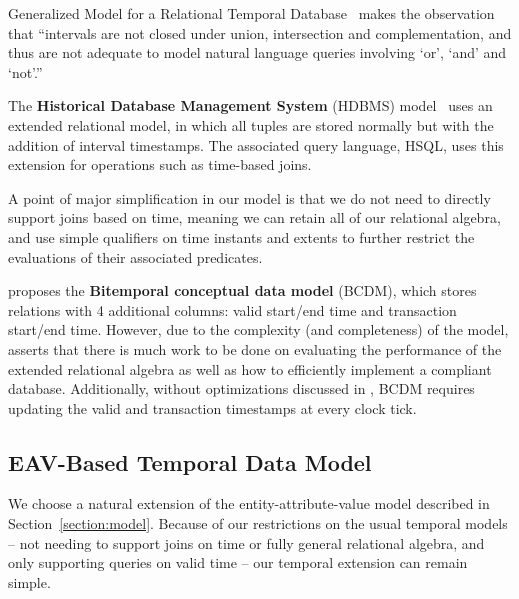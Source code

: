Generalized Model for a Relational Temporal
Database~\cite{gadia1988generalized} makes the observation that ``intervals are
not closed under union, intersection and complementation, and thus are not
adequate to model natural language queries involving `or', `and' and `not'.''

The \textbf{Historical Database Management System} (HDBMS)
model~\cite{sarda1990extensions} uses an extended relational model, in which
all tuples are stored normally but with the addition of interval timestamps.
The associated query language, HSQL, uses this extension for operations such as
time-based joins.

A point of major simplification in our model is that we do not need to directly
support joins based on time, meaning we can retain all of our relational
algebra, and use simple qualifiers on time instants and extents to further
restrict the evaluations of their associated predicates.

\cite{jensen1994unifying} proposes the \textbf{Bitemporal conceptual data
model} (BCDM), which stores relations with 4 additional columns: valid
start/end time and transaction start/end time. However, due to the complexity
(and completeness) of the model, \cite{jensen1999temporal} asserts that there
is much work to be done on evaluating the performance of the extended
relational algebra as well as how to efficiently implement a compliant
database. Additionally, without optimizations discussed in
\cite{jensen1999temporal}, BCDM requires updating the valid and transaction
timestamps at every clock tick.


\subsection{EAV-Based Temporal Data Model}

We choose a natural extension of the entity-attribute-value model described in Section~\ref{section:model}.
Because of our restrictions on the usual temporal models -- not needing to support joins on time or fully
general relational algebra, and only supporting queries on valid time -- our temporal extension can remain
simple.


